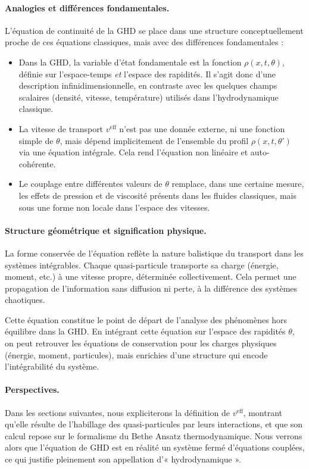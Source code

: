 \paragraph{Analogies et différences fondamentales.}
L’équation de continuité de la GHD se place dans une structure conceptuellement proche de ces équations classiques, mais avec des différences fondamentales :
\begin{itemize}
    \item Dans la GHD, la variable d’état fondamentale est la fonction $\rho(x,t,\theta)$, définie sur l’espace-temps \emph{et} l’espace des rapidités. Il s’agit donc d’une description infinidimensionnelle, en contraste avec les quelques champs scalaires (densité, vitesse, température) utilisés dans l’hydrodynamique classique.
    \item La vitesse de transport $v^{\mathrm{eff}}$ n’est pas une donnée externe, ni une fonction simple de $\theta$, mais dépend implicitement de l’ensemble du profil $\rho(x,t,\theta')$ via une équation intégrale. Cela rend l’équation non linéaire et auto-cohérente.
    \item Le couplage entre différentes valeurs de $\theta$ remplace, dans une certaine mesure, les effets de pression et de viscosité présents dans les fluides classiques, mais sous une forme non locale dans l’espace des vitesses.
\end{itemize}

\paragraph{Structure géométrique et signification physique.}
La forme conservée de l’équation reflète la nature balistique du transport dans les systèmes intégrables. Chaque quasi-particule transporte sa charge (énergie, moment, etc.) à une vitesse propre, déterminée collectivement. Cela permet une propagation de l’information sans diffusion ni perte, à la différence des systèmes chaotiques.

Cette équation constitue le point de départ de l’analyse des phénomènes hors équilibre dans la GHD. En intégrant cette équation sur l’espace des rapidités $\theta$, on peut retrouver les équations de conservation pour les charges physiques (énergie, moment, particules), mais enrichies d’une structure qui encode l’intégrabilité du système.

\paragraph{Perspectives.}
Dans les sections suivantes, nous expliciterons la définition de $v^{\mathrm{eff}}$, montrant qu’elle résulte de l’habillage des quasi-particules par leurs interactions, et que son calcul repose sur le formalisme du Bethe Ansatz thermodynamique. Nous verrons alors que l’équation de GHD est en réalité un système fermé d’équations couplées, ce qui justifie pleinement son appellation d’« hydrodynamique ».


